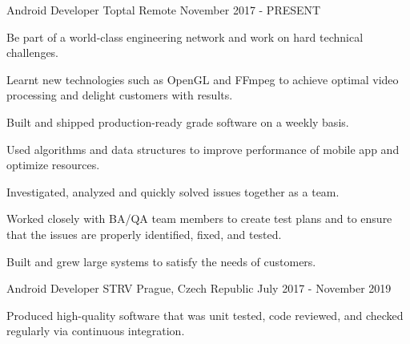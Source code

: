 

\begin{cventries}


  \cventry
    {Android Developer}
    {Toptal}
    {Remote}
    {November 2017 - PRESENT}
    {
      \begin{cvitems}
        \item {Be part of a world-class engineering network and work on hard technical challenges.}
        \item {Learnt new technologies such as OpenGL and FFmpeg to achieve optimal video processing and delight customers with results.}
        \item {Built and shipped production-ready grade software on a weekly basis.}
        \item {Used algorithms and data structures to improve performance of mobile app and optimize resources.}
        \item {Investigated, analyzed and quickly solved issues together as a team.}
        \item {Worked closely with BA/QA team members to create test plans and to ensure that the issues are properly identified, fixed, and tested.}
        \item {Built and grew large systems to satisfy the needs of customers.}
      \end{cvitems}
      \begin{cvsubentries}
      \end{cvsubentries}
    }
  \cventry
    {Android Developer}
    {STRV}
    {Prague, Czech Republic}
    {July 2017 - November 2019}
    {
      \begin{cvitems}
        \item {Produced high-quality software that was unit tested, code reviewed, and checked regularly via continuous integration.}

\end{cvitems}}
\end{cventries}
